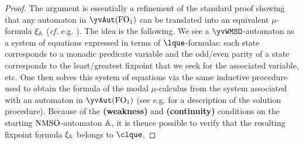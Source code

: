 \begin{proof} The argument is
 essentially a refinement of the standard proof showing that any automaton in $\yvAut(\ofo)$ can be translated into an equivalent $\mu$-formula
$\xi_\mathbb{A}$ (\emph{cf.} e.g. \cite{Ven08}).
The idea is the following. We see a $\yvWMSO$-automaton as a system of equations expressed in terms of $\lque$-formulas: each state corresponds to a monadic predicate variable and the odd/even parity of a state corresponds to the least/greatest fixpoint that we seek for the associated variable, etc. One then solves this system of equations via the same inductive procedure used to obtain the formula of the modal $\mu$-calculus from the system associated with an automaton in $\yvAut(\ofo)$ (see e.g. \cite{ArnoldN01} for a description of the solution procedure). Because of the \textbf{(weakness)} and \textbf{(continuity)} conditions on the starting $\mathrm{NMSO}$-automaton $\mathbb{A}$, it is thence possible to verify that the resulting fixpoint formula $\xi_\mathbb{A}$ belongs to $\clque$.
%
\end{proof}
